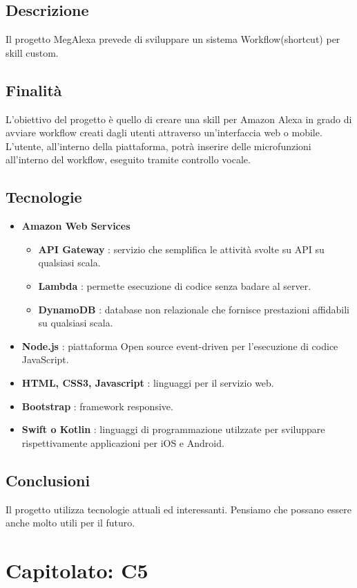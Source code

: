 \documentclass{article}
\begin{document}
		\subsection{Descrizione}
			Il progetto MegAlexa prevede di sviluppare un sistema Workflow(shortcut) per skill custom.
		\subsection{Finalità}
			L'obiettivo del progetto è quello di creare una skill per Amazon Alexa in grado di avviare workflow creati dagli utenti attraverso un'interfaccia web o mobile.
			L'utente, all'interno della piattaforma, potrà inserire delle microfunzioni all'interno del workflow, eseguito tramite controllo vocale.
		\subsection{Tecnologie}
			\begin{itemize}
				\item \textbf{Amazon Web Services}
					\begin{itemize}
						\item \textbf{API Gateway} : servizio che semplifica le attività svolte su API su qualsiasi scala.
						\item \textbf{Lambda} : permette esecuzione di codice senza badare al server.
						\item \textbf{DynamoDB} : database non relazionale che fornisce prestazioni affidabili su qualsiasi scala.
					\end{itemize}
				\item \textbf{Node.js} : piattaforma Open source event-driven per l'esecuzione di codice JavaScript.
				\item \textbf{HTML, CSS3, Javascript} : linguaggi per il servizio web.
				\item \textbf{Bootstrap} : framework responsive.
				\item \textbf{Swift o Kotlin} : linguaggi di programmazione utilzzate per sviluppare rispettivamente applicazioni per iOS e Android.
			\end{itemize}
		\subsection{Conclusioni}
			Il progetto utilizza tecnologie attuali ed interessanti. Pensiamo che possano essere anche molto utili per il futuro.
			
\newpage
\section{Capitolato: C5}
\end{document}

